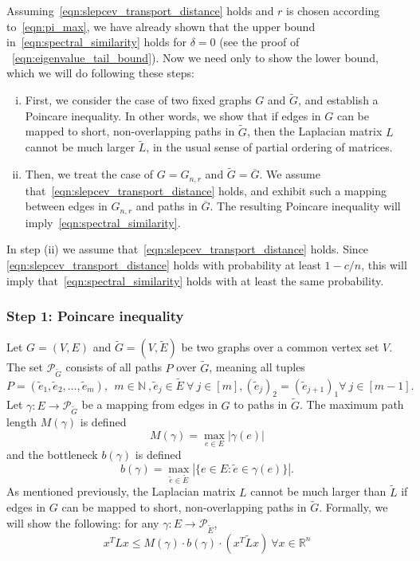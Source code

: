 \documentclass{article}
\newcommand{\Reals}{\mathbb{R}}
\newcommand{\abs}[1]{\left \lvert #1 \right \rvert}
\newcommand{\1}{\mathbf{1}}
\newcommand{\wt}[1]{\widetilde{#1}}
\theoremstyle{alden}
\theoremstyle{aldenthm}
\theoremstyle{definition}
\theoremstyle{remark}
\begin{document}
Assuming~\eqref{eqn:slepcev_transport_distance} holds and $r$ is chosen according to~\eqref{eqn:pi_max}, we have already shown that the upper bound in~\eqref{eqn:spectral_similarity} holds for $\delta = 0$ (see the proof of ~\eqref{eqn:eigenvalue_tail_bound}). Now we need only to show the lower bound, which we will do following these steps:
\begin{enumerate}[(i)]
	\item First, we consider the case of two fixed graphs $G$ and $\wt{G}$, and establish a Poincare inequality. In other words, we show that if edges in $G$ can be mapped to short, non-overlapping paths in $\wt{G}$, then the Laplacian matrix $L$ cannot be much larger $\wt{L}$, in the usual sense of partial ordering of matrices.
	\item Then, we treat the case of $G = G_{n,r}$ and $\wt{G} = \overline{G}$. We assume that~\eqref{eqn:slepcev_transport_distance} holds, and exhibit such a mapping between edges in $G_{n,r}$ and paths in $\overline{G}$. The resulting Poincare inequality will imply~\eqref{eqn:spectral_similarity}.
\end{enumerate}
In step (ii) we assume that~\eqref{eqn:slepcev_transport_distance} holds. Since \eqref{eqn:slepcev_transport_distance} holds with probability at least $1 - c/n$, this will imply that~\eqref{eqn:spectral_similarity} holds with at least the same probability.

\subsubsection{Step 1: Poincare inequality}

Let $G = (V,E)$ and $\wt{G} = (V,\wt{E})$ be two graphs over a common vertex set $V$. The set $\mathcal{P}_{\wt{G}}$ consists of all paths $P$ over $\wt{G}$, meaning all tuples
\begin{equation*}
P = (\wt{e}_1,\wt{e}_2,\ldots,\wt{e}_m),~~m \in \mathbb{N}~, \wt{e}_j \in \wt{E}~ \forall~ j \in [m], (\wt{e}_j)_2 = (\wt{e}_{j + 1})_1 \forall~j \in [m - 1].
\end{equation*}
Let $\gamma:E \to \mathcal{P}_{\wt{G}}$ be a mapping from edges in $G$ to paths in $\wt{G}$. The maximum path length $M(\gamma)$ is defined
\begin{equation*}
M(\gamma) = \max_{e \in E} \abs{\gamma(e)}
\end{equation*} 
and the bottleneck $b(\gamma)$ is defined
\begin{equation*}
b(\gamma) = \max_{\wt{e} \in \wt{E}} \abs{\{e \in E:  \wt{e} \in \gamma(e)\}}.
\end{equation*}
As mentioned previously, the Laplacian matrix $L$ cannot be much larger than $\wt{L}$ if edges in $G$ can be mapped to short, non-overlapping paths in $\wt{G}$. Formally, we will show the following: for any $\gamma: E \to \mathcal{P}_{\wt{E}}$,
\begin{equation}
\label{eqn:poincare_inequality}
x^T L x \leq M(\gamma)\cdot b(\gamma) \cdot (x^T \wt{L} x)~\forall{x \in \Reals^n}
\end{equation} 
\end{document}
